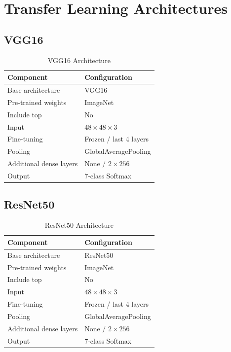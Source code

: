 \documentclass[12pt, a4paper]{report}
\let\oldsection\section
\renewcommand{\section}{%
    \Needspace{6\baselineskip}%
    \oldsection
}
\let\oldsubsection\subsection
\renewcommand{\subsection}{%
    \Needspace{6\baselineskip}%
    \oldsubsection
}
\begin{document}
		\section{Transfer Learning Architectures}
	
			\subsection{VGG16}
				
				\begin{table}[H]
					\centering
					\caption{VGG16 Architecture}
					\label{tab:vgg16}
					\begin{tabular}{ll}
						\toprule
						Component & Configuration  \\	
						\midrule
						Base architecture & VGG16 \\
						Pre-trained weights & ImageNet \\
						Include top & No \\
						Input & $48\times48\times3$ \\
						Fine-tuning & Frozen / last 4 layers \\
						Pooling & GlobalAveragePooling \\
						Additional dense layers & None / $2\times256$ \\
						Output & 7-class Softmax \\
						\bottomrule
					\end{tabular}
				\end{table}
			
			\subsection{ResNet50}
				
				\begin{table}[H]
					\centering
					\caption{ResNet50 Architecture}
					\label{tab:resnet50}
					\begin{tabular}{ll}
						\toprule
						Component & Configuration  \\	
						\midrule
						Base architecture & ResNet50 \\
						Pre-trained weights & ImageNet \\
						Include top & No \\
						Input & $48\times48\times3$ \\
						Fine-tuning & Frozen / last 4 layers \\
						Pooling & GlobalAveragePooling \\
						Additional dense layers & None / $2\times256$ \\
						Output & 7-class Softmax \\
						\bottomrule
					\end{tabular}
				\end{table}
			
\end{document}
